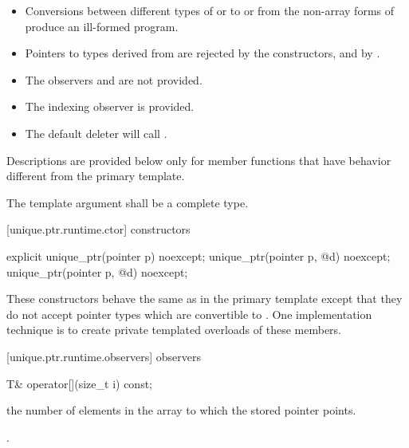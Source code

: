 \begin{itemize}
\item Conversions between different types of
 or to or from the non-array forms of
 produce an ill-formed program.

\item Pointers to types derived from  are
rejected by the constructors, and by .

\item The observers  and
 are not provided.

\item The indexing observer  is provided.

\item The default deleter will call .
\end{itemize}

\pnum
Descriptions are provided below only for member functions that
have behavior different from the primary template.

\pnum
The template argument  shall be a complete type.

[unique.ptr.runtime.ctor]{ constructors}

%
\begin{itemdecl}
explicit unique_ptr(pointer p) noexcept;
unique_ptr(pointer p, @\seebelow@ d) noexcept;
unique_ptr(pointer p, @\seebelow@ d) noexcept;
\end{itemdecl}

\begin{itemdescr}
These constructors behave the same as in the primary template
except that they do not accept pointer types which are convertible
to . \enternote One implementation technique
is to create private templated overloads of these members. \exitnote
\end{itemdescr}

[unique.ptr.runtime.observers]{ observers}

\begin{itemdecl}
T& operator[](size_t i) const;
\end{itemdecl}

\begin{itemdescr}
\pnum
\requires {} the
number of elements in the array to which
the stored pointer points.

\pnum
\returns {}.
\end{itemdescr}

